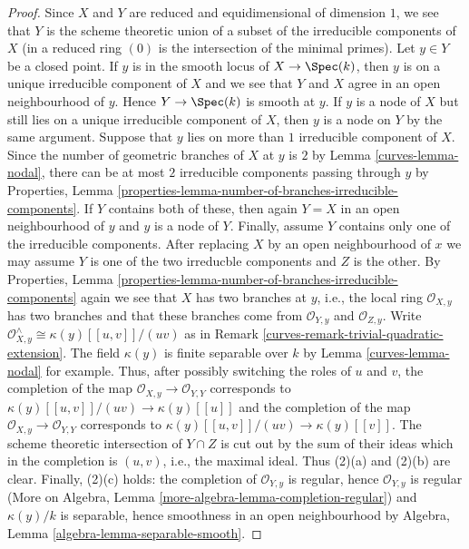 \begin{proof}

Since $X$ and $Y$ are reduced and equidimensional of dimension $1$,
we see that $Y$ is the scheme theoretic union of a subset of the
irreducible components of $X$ (in a reduced ring $(0)$
is the intersection of the minimal primes).
Let $y \in Y$ be a closed point.
If $y$ is in the smooth locus of
$X \to \Spec(k)$, then $y$ is on a unique irreducible component
of $X$ and we see that $Y$ and $X$ agree in an open neighbourhood
of $y$. Hence $Y \to \Spec(k)$ is smooth at $y$.
If $y$ is a node of $X$ but still lies on a unique irreducible
component of $X$, then $y$ is a node on $Y$ by the same argument.
Suppose that $y$ lies on more than $1$ irreducible component of $X$.
Since the number of geometric branches of $X$ at $y$ is $2$
by Lemma \ref{curves-lemma-nodal},
there can be at most $2$ irreducible components passing through $y$
by Properties, Lemma
\ref{properties-lemma-number-of-branches-irreducible-components}.
If $Y$ contains both of these, then again $Y = X$ in an open neighbourhood
of $y$ and $y$ is a node of $Y$. Finally, assume $Y$ contains only one
of the irreducible components. After replacing $X$ by an open
neighbourhood of $x$ we may assume $Y$ is one of the two
irreducble components and $Z$ is the other. By Properties, Lemma
\ref{properties-lemma-number-of-branches-irreducible-components}
again we see that $X$ has two branches at $y$, i.e., the local ring
$\mathcal{O}_{X, y}$ has two branches and that these branches
come from $\mathcal{O}_{Y, y}$ and $\mathcal{O}_{Z, y}$. Write
$\mathcal{O}_{X, y}^\wedge \cong \kappa(y)[[u, v]]/(uv)$
as in Remark \ref{curves-remark-trivial-quadratic-extension}.
The field $\kappa(y)$ is finite separable over $k$ by
Lemma \ref{curves-lemma-nodal} for example.
Thus, after possibly switching the roles of $u$ and $v$,
the completion of the map
$\mathcal{O}_{X, y} \to \mathcal{O}_{Y, Y}$
corresponds to $\kappa(y)[[u, v]]/(uv) \to \kappa(y)[[u]]$
and the completion of the map
$\mathcal{O}_{X, y} \to \mathcal{O}_{Y, Y}$
corresponds to $\kappa(y)[[u, v]]/(uv) \to \kappa(y)[[v]]$.
The scheme theoretic intersection of $Y \cap Z$ is cut out
by the sum of their ideas which in the completion is $(u, v)$, i.e.,
the maximal ideal. Thus (2)(a) and (2)(b) are clear.
Finally, (2)(c) holds: the completion of $\mathcal{O}_{Y, y}$
is regular, hence $\mathcal{O}_{Y, y}$ is regular
(More on Algebra, Lemma \ref{more-algebra-lemma-completion-regular})
and $\kappa(y)/k$ is separable, hence
smoothness in an open neighbourhood
by Algebra, Lemma \ref{algebra-lemma-separable-smooth}.
\end{proof}


